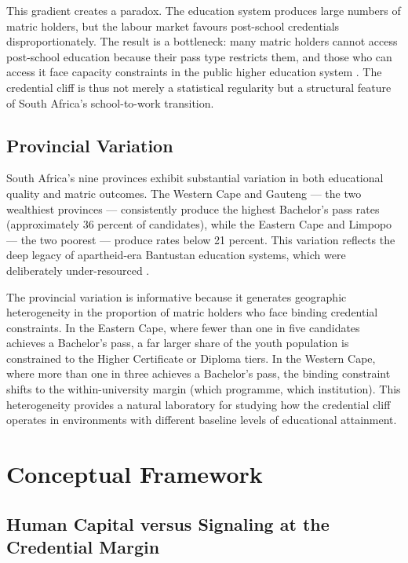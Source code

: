 \documentclass[12pt]{article}
\begin{document}
This gradient creates a paradox. The education system produces large numbers of matric holders, but the labour market favours post-school credentials disproportionately. The result is a bottleneck: many matric holders cannot access post-school education because their pass type restricts them, and those who can access it face capacity constraints in the public higher education system \citep{dhet2020monitor}. The credential cliff is thus not merely a statistical regularity but a structural feature of South Africa's school-to-work transition.

\subsection{Provincial Variation}

South Africa's nine provinces exhibit substantial variation in both educational quality and matric outcomes. The Western Cape and Gauteng --- the two wealthiest provinces --- consistently produce the highest Bachelor's pass rates (approximately 36 percent of candidates), while the Eastern Cape and Limpopo --- the two poorest --- produce rates below 21 percent. This variation reflects the deep legacy of apartheid-era Bantustan education systems, which were deliberately under-resourced \citep{vanderberg2007apartheid, spaull2013poverty}.

The provincial variation is informative because it generates geographic heterogeneity in the proportion of matric holders who face binding credential constraints. In the Eastern Cape, where fewer than one in five candidates achieves a Bachelor's pass, a far larger share of the youth population is constrained to the Higher Certificate or Diploma tiers. In the Western Cape, where more than one in three achieves a Bachelor's pass, the binding constraint shifts to the within-university margin (which programme, which institution). This heterogeneity provides a natural laboratory for studying how the credential cliff operates in environments with different baseline levels of educational attainment.


\section{Conceptual Framework}
\label{sec:framework}

\subsection{Human Capital versus Signaling at the Credential Margin}
\end{document}
